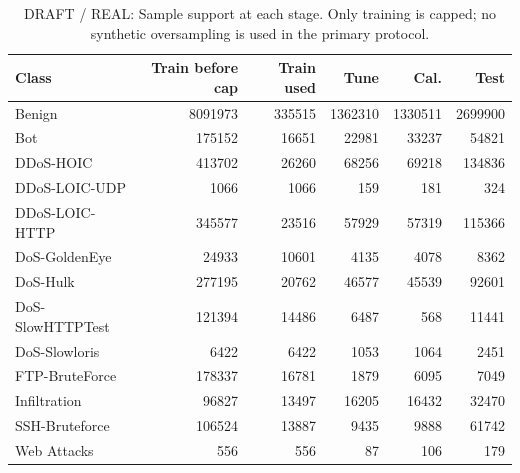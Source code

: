 \begin{table}[t]
\centering
\caption{DRAFT / REAL: Sample support at each stage. Only training is capped; no synthetic oversampling is used in the primary protocol.}
\label{tab:data}
\begin{tabular}{lrrrrr}
\toprule
Class & Train before cap & Train used & Tune & Cal. & Test \\
\midrule
Benign & 8091973 & 335515 & 1362310 & 1330511 & 2699900 \\
Bot & 175152 & 16651 & 22981 & 33237 & 54821 \\
DDoS-HOIC & 413702 & 26260 & 68256 & 69218 & 134836 \\
DDoS-LOIC-UDP & 1066 & 1066 & 159 & 181 & 324 \\
DDoS-LOIC-HTTP & 345577 & 23516 & 57929 & 57319 & 115366 \\
DoS-GoldenEye & 24933 & 10601 & 4135 & 4078 & 8362 \\
DoS-Hulk & 277195 & 20762 & 46577 & 45539 & 92601 \\
DoS-SlowHTTPTest & 121394 & 14486 & 6487 & 568 & 11441 \\
DoS-Slowloris & 6422 & 6422 & 1053 & 1064 & 2451 \\
FTP-BruteForce & 178337 & 16781 & 1879 & 6095 & 7049 \\
Infiltration & 96827 & 13497 & 16205 & 16432 & 32470 \\
SSH-Bruteforce & 106524 & 13887 & 9435 & 9888 & 61742 \\
Web Attacks & 556 & 556 & 87 & 106 & 179 \\
\bottomrule
\end{tabular}
\end{table}
